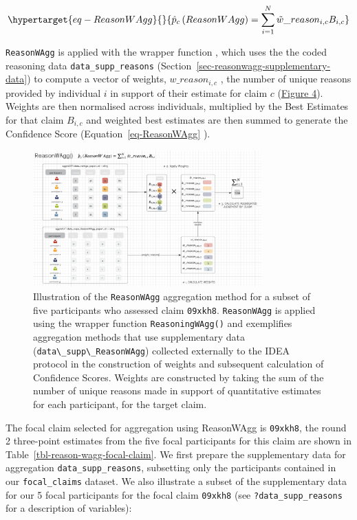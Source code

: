 \documentclass[article]{jss}
\newcommand{\fct}[1]{\code{#1()}}
\begin{document}
\begin{equation}\protect\hypertarget{eq-ReasonWAgg}{}{
\hat{p}_c\left( ReasonWAgg \right) = \sum_{i=1}^N \tilde{w}\_reason_{i,c}B_{i,c}
}\label{eq-ReasonWAgg}\end{equation}

\texttt{ReasonWAgg} is applied with the wrapper function
\fct{ReasoningWAgg}, which uses the the coded reasoning data
\texttt{data\_supp\_reasons}
(Section~\ref{sec-reasonwagg-supplementary-data}) to compute a vector of
weights, \(w\_reason_{i,c}\) , the number of unique reasons provided by
individual \(i\) in support of their estimate for claim \(c\)
(\protect\hyperlink{fig-ReasonWAgg}{Figure 4}). Weights are then
normalised across individuals, multiplied by the Best Estimates for that
claim \(B_{i,c}\) and weighted best estimates are then summed to
generate the Confidence Score (Equation~\ref{eq-ReasonWAgg} ).

\begin{figure}

{\centering \includegraphics[width=3.46in,height=\textheight]{images/img_ReasonWAgg.png}

}

\caption{\label{fig-ReasonWAgg}Illustration of the \texttt{ReasonWAgg}
aggregation method for a subset of five participants who assessed claim
\texttt{09xkh8}. \texttt{ReasonWAgg} is applied using the wrapper
function \texttt{ReasoningWAgg()} and exemplifies aggregation methods
that use supplementary data
(\texttt{data\textbackslash{}\_supp\textbackslash{}\_ReasonWAgg})
collected externally to the IDEA protocol in the construction of weights
and subsequent calculation of Confidence Scores. Weights are constructed
by taking the sum of the number of unique reasons made in support of
quantitative estimates for each participant, for the target claim.}

\end{figure}

The focal claim selected for aggregation using ReasonWAgg is
\texttt{09xkh8}, the round 2 three-point estimates from the five focal
participants for this claim are shown in
Table~\ref{tbl-reason-wagg-focal-claim}. We first prepare the
supplementary data for aggregation \texttt{data\_supp\_reasons},
subsetting only the participants contained in our \texttt{focal\_claims}
dataset. We also illustrate a subset of the supplementary data for our 5
focal participants for the focal claim \texttt{09xkh8} (see
\texttt{?data\_supp\_reasons} for a description of variables):
\end{document}
